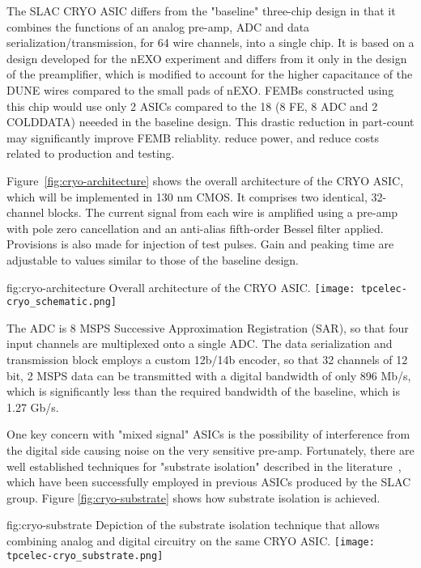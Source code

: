 The SLAC CRYO ASIC differs from the "baseline" three-chip design in that it combines the functions of an analog pre-amp, ADC and data serialization/transmission, for 64 wire channels, into a single chip.
It is based on a design developed for the nEXO experiment and differs from it only in the design of the preamplifier, which is modified to account for the higher capacitance of the DUNE wires compared to the small pads of nEXO.
FEMBs constructed using this chip would use only 2 ASICs compared to the 18 (8 FE, 8 ADC and 2 COLDDATA) neeeded in the baseline design.
This drastic reduction in part-count may significantly improve FEMB reliablity. reduce power, and reduce costs related to production and testing. 

Figure~\ref{fig:cryo-architecture} shows the overall architecture of the CRYO ASIC, which will be implemented in 130 nm CMOS.
It comprises two identical, 32-channel blocks. 
The current signal from each wire is amplified using a pre-amp with pole zero cancellation and an anti-alias fifth-order Bessel filter applied. 
Provisions is also made for injection of test pulses. 
Gain and peaking time are adjustable to values similar to those of the baseline design.

\begin{dunefigure}
{fig:cryo-architecture}
{Overall architecture of the CRYO ASIC.}
\texttt{[image: tpcelec-cryo\_schematic.png]}
\end{dunefigure}

The ADC is 8 MSPS Successive Approximation Registration (SAR), so that four input channels are multiplexed onto a single ADC. The data serialization and transmission block employs a custom 12b/14b encoder, so that 32 channels of 12 bit, 2 MSPS data can be transmitted with a digital bandwidth of only 896 Mb/s, which is significantly less than the required bandwidth of the baseline, which is 1.27 Gb/s.

One key concern with "mixed signal" ASICs is the possibility of interference from the digital side causing noise on the very sensitive pre-amp. 
Fortunately, there are well established techniques for "substrate isolation" described in the literature~\cite{yeh}, which have been successfully employed in previous ASICs produced by the SLAC group. Figure \ref{fig:cryo-substrate} shows how substrate isolation is achieved. 

\begin{dunefigure}
{fig:cryo-substrate}
{Depiction of the substrate isolation technique that allows combining analog and digital circuitry on the same CRYO ASIC.}
\texttt{[image: tpcelec-cryo\_substrate.png]}
\end{dunefigure}

